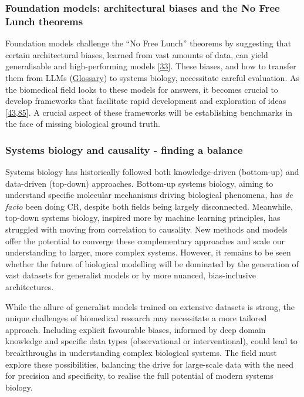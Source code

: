 \hypertarget{foundation-models-architectural-biases-and-the-no-free-lunch-theorems}{%
\subsubsection{Foundation models: architectural biases and the No Free Lunch theorems}\label{foundation-models-architectural-biases-and-the-no-free-lunch-theorems}}

Foundation models challenge the ``No Free Lunch'' theorems by suggesting that certain architectural biases, learned from vast amounts of data, can yield generalisable and high-performing models {[}\protect\hyperlink{ref-D3JIQ7Oe}{33}{]}.
These biases, and how to transfer them from LLMs (\protect\hyperlink{large-language-models}{Glossary}) to systems biology, necessitate careful evaluation.
As the biomedical field looks to these models for answers, it becomes crucial to develop frameworks that facilitate rapid development and exploration of ideas {[}\protect\hyperlink{ref-tr1XjZ1R}{43},\protect\hyperlink{ref-Ex1JrMxh}{85}{]}.
A crucial aspect of these frameworks will be establishing benchmarks in the face of missing biological ground truth.

\hypertarget{systems-biology-and-causality---finding-a-balance}{%
\subsubsection{Systems biology and causality - finding a balance}\label{systems-biology-and-causality---finding-a-balance}}

Systems biology has historically followed both knowledge-driven (bottom-up) and data-driven (top-down) approaches.
Bottom-up systems biology, aiming to understand specific molecular mechanisms driving biological phenomena, has \emph{de facto} been doing CR, despite both fields being largely disconnected.
Meanwhile, top-down systems biology, inspired more by machine learning principles, has struggled with moving from correlation to causality.
New methods and models offer the potential to converge these complementary approaches and scale our understanding to larger, more complex systems.
However, it remains to be seen whether the future of biological modelling will be dominated by the generation of vast datasets for generalist models or by more nuanced, bias-inclusive architectures.

While the allure of generalist models trained on extensive datasets is strong, the unique challenges of biomedical research may necessitate a more tailored approach.
Including explicit favourable biases, informed by deep domain knowledge and specific data types (observational or interventional), could lead to breakthroughs in understanding complex biological systems.
The field must explore these possibilities, balancing the drive for large-scale data with the need for precision and specificity, to realise the full potential of modern systems biology.

